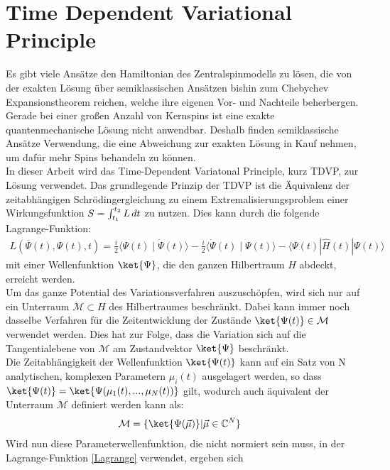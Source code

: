 \chapter{Time Dependent Variational Principle}\label{make}
Es gibt viele Ansätze den Hamiltonian des Zentralspinmodells zu lösen, die von der exakten Lösung über 
semiklassischen Ansätzen\cite{PhysRevB.65.205309,PhysRevB.94.094308,PhysRevB.70.205327,NatalieJaeschke} bishin zum
Chebychev Expansionstheorem reichen\cite{PhysRevB.89.045317}, welche ihre eigenen Vor- und Nachteile beherbergen. 
Gerade bei einer großen Anzahl von Kernspins ist eine exakte quantenmechanische Lösung nicht anwendbar. Deshalb finden semiklassische Ansätze Verwendung, 
die eine Abweichung zur exakten Lösung in Kauf nehmen, um dafür mehr Spins behandeln zu können. \\ 
In dieser Arbeit wird das Time-Dependent Variatonal Principle, kurz TDVP, zur Lösung verwendet.
Das grundlegende Prinzip der TDVP ist die Äquivalenz der zeitabhängigen Schrödingergleichung zu einem Extremalisierungsproblem einer 
Wirkungsfunktion $S=\int_{t_1}^{t_2}L \thinspace dt$ zu nutzen. Dies kann durch die folgende Lagrange-Funktion:
\begin{align}\label{Lagrange}
    L\left(\overline{\Psi}(t), \Psi(t), t\right)=\frac{i}{2}\langle\Psi(t) \mid \dot{\Psi}(t)\rangle-\frac{i}{2}\langle\dot{\Psi}(t) \mid \Psi(t)\rangle-\langle\Psi(t)|\hat{H}(t)| \Psi(t)\rangle
\end{align}
mit einer Wellenfunktion $\ket{\Psi}$, die den ganzen Hilbertraum $H$ abdeckt, erreicht werden. \\
\noindent Um das ganze Potential des Variationsverfahren auszuschöpfen, wird sich nur auf ein Unterraum $\mathcal{M}\subset H$ des
Hilbertraumes beschränkt. Dabei kann immer noch dasselbe Verfahren für die Zeitentwicklung der Zustände $\ket{\Psi(t)}\in\mathcal{M}$
verwendet werden. Dies hat zur Folge, dass die Variation sich auf die Tangentialebene von $\mathcal{M}$ am Zustandvektor $\ket{\Psi}$
beschränkt.\\
Die Zeitabhängigkeit der Wellenfunktion $\ket{\Psi(t)}$ kann auf ein Satz von N analytischen, komplexen Parametern $\mu_i(t)$ ausgelagert werden, 
so dass $\ket{\Psi(t)} = \ket{\Psi(\mu_1(t),...,\mu_N(t))}$ gilt, wodurch auch äquivalent der Unterraum $\mathcal{M}$ definiert werden kann als:
\begin{align}
    \mathcal{M} &= \{\ket{\Psi(\vec{\mu})}|\vec{\mu}\in \mathbb{C}^N\}
\end{align}
Wird nun diese Parameterwellenfunktion, die nicht normiert sein muss, in der Lagrange-Funktion \autoref{Lagrange} verwendet, ergeben sich 
